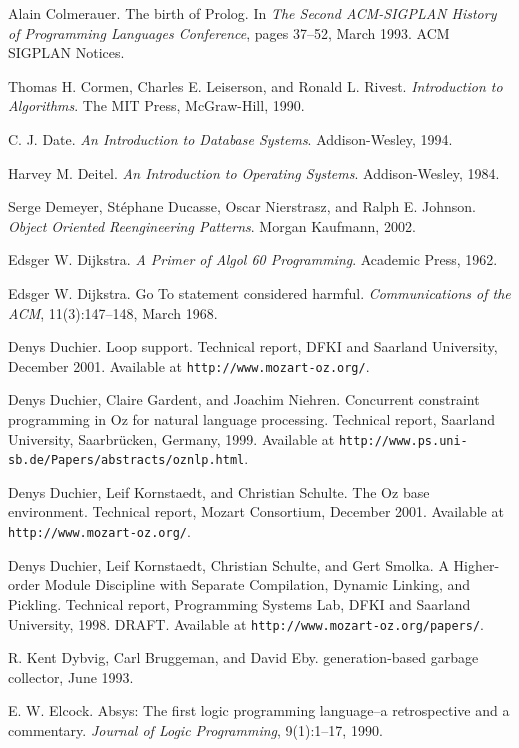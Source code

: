 \begin{thebibliography}{213}
Alain Colmerauer. The birth of Prolog. In \emph{The Second ACM-SIGPLAN History of Programming Languages Conference}, pages 37–52, March 1993. ACM SIGPLAN Notices.

Thomas H. Cormen, Charles E. Leiserson, and Ronald L. Rivest. \emph{Introduction to Algorithms}. The MIT Press, McGraw-Hill, 1990.

C. J. Date. \emph{An Introduction to Database Systems}. Addison-Wesley, 1994.

Harvey M. Deitel. \emph{An Introduction to Operating Systems}. Addison-Wesley, 1984.

Serge Demeyer, St\'ephane Ducasse, Oscar Nierstrasz, and Ralph E. Johnson. \emph{Object Oriented Reengineering Patterns}. Morgan Kaufmann, 2002.

Edsger W. Dijkstra. \emph{A Primer of Algol 60 Programming}. Academic Press, 1962.

Edsger W. Dijkstra. Go To statement considered harmful. \emph{Communications of the ACM}, 11(3):147–148, March 1968.

Denys Duchier. Loop support. Technical report, DFKI and Saarland University, December 2001. Available at \verb"http://www.mozart-oz.org/".

Denys Duchier, Claire Gardent, and Joachim Niehren. Concurrent constraint programming in Oz for natural language processing. Technical report, Saarland University, Saarbr\"ucken, Germany, 1999. Available at \verb"http://www.ps.uni-sb.de/Papers/abstracts/oznlp.html".

Denys Duchier, Leif Kornstaedt, and Christian Schulte. The Oz base environment. Technical report, Mozart Consortium, December 2001. Available at \verb"http://www.mozart-oz.org/".

Denys Duchier, Leif Kornstaedt, Christian Schulte, and Gert Smolka. A Higher-order Module Discipline with Separate Compilation, Dynamic Linking, and Pickling. Technical report, Programming Systems Lab, DFKI and Saarland University, 1998. DRAFT. Available at \verb"http://www.mozart-oz.org/papers/".

R. Kent Dybvig, Carl Bruggeman, and David Eby. generation-based garbage collector, June 1993.

E. W. Elcock. Absys: The first logic programming language–a retrospective and a commentary. \emph{Journal of Logic Programming}, 9(1):1–17, 1990.


\end{thebibliography}

